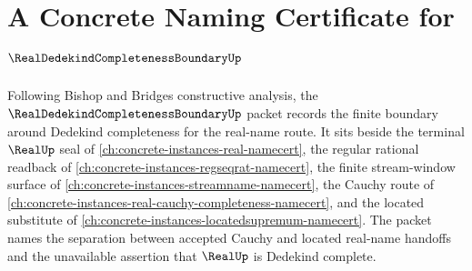 \chapter{A Concrete Naming Certificate for $\RealDedekindCompletenessBoundaryUp$}
\label{ch:concrete-instances-real-dedekind-completeness-boundary-namecert}

Following Bishop and Bridges constructive analysis, the $\RealDedekindCompletenessBoundaryUp$ packet records the finite boundary around Dedekind completeness for the real-name route. It sits beside the terminal $\RealUp$ seal of \autoref{ch:concrete-instances-real-namecert}, the regular rational readback of \autoref{ch:concrete-instances-regseqrat-namecert}, the finite stream-window surface of \autoref{ch:concrete-instances-streamname-namecert}, the Cauchy route of \autoref{ch:concrete-instances-real-cauchy-completeness-namecert}, and the located substitute of \autoref{ch:concrete-instances-locatedsupremum-namecert}. The packet names the separation between accepted Cauchy and located real-name handoffs and the unavailable assertion that $\RealUp$ is Dedekind complete.

